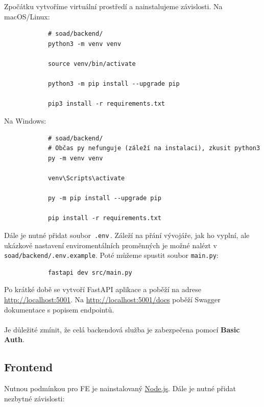 \documentclass[12pt]{article}
\begin{document}
\begin{teamwork}
        Zpočátku vytvoříme virtuální prostředí a nainstalujeme závislosti.
        Na macOS/Linux:

        \begin{verbatim}
            # soad/backend/
            python3 -m venv venv

            source venv/bin/activate

            python3 -m pip install --upgrade pip

            pip3 install -r requirements.txt
        \end{verbatim}

        \clearpage

        Na Windows:

        \begin{verbatim}
            # soad/backend/
            # Občas py nefunguje (záleží na instalaci), zkusit python3
            py -m venv venv

            venv\Scripts\activate

            py -m pip install --upgrade pip

            pip install -r requirements.txt
        \end{verbatim}

        Dále je nutné přidat soubor \,\texttt{.env}\,.
        Záleží na přání vývojáře, jak ho vyplní, ale ukázkové nastavení enviromentálních
        proměnných je možné nalézt v \texttt{soad/backend/.env.example}.
        Poté můžeme spustit soubor \texttt{main.py}:

        \begin{verbatim}
            fastapi dev src/main.py
        \end{verbatim}

        Po krátké době se vytvoří FastAPI aplikace a poběží na adrese \href{http://localhost:5001}{http://localhost:5001}.
        Na \href{http://localhost:5001/docs}{http://localhost:5001/docs} poběží Swagger dokumentace s popisem endpointů.
        \\
        \\
        Je důležité zmínit, že celá backendová služba je zabezpečena pomocí \textbf{Basic Auth}.

        \subsection{Frontend}\label{subsec:frontend}

        Nutnou podmínkou pro FE je nainstalovaný \href{https://nodejs.org/en/download}{Node.js}.
        Dále je nutné přidat nezbytné závislosti:


\end{teamwork}
\end{document}
